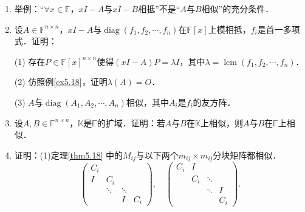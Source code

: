 \documentclass[a4paper,fontset=windows]{ctexbook}
\theoremstyle{definition}
\DeclareMathOperator{\diag}{diag}
\DeclareMathOperator{\lcm}{lcm}
\begin{document}
\begin{enumerate}
\item 举例：``$\forall x\in\mathbb{F}$，$xI-A$与$xI-B$相抵''不是``$A$与$B$相似''的充分条件．

\item 设$A\in\mathbb{F}^{n\times n}$，$xI-A$与$\diag(f_1,f_2,\cdots,f_n)$在$\mathbb{F}[x]$上模相抵，$f_i$是首一多项式．证明：

(1) 存在$P\in\mathbb{F}[x]^{n\times n}$使得$(xI-A)P=\lambda I$，其中$\lambda=\lcm(f_1,f_2,\cdots,f_n)$．

(2) 仿照例\ref{ex5.18}，证明$\lambda(A)=O$．

(3) $A$与$\diag(A_1,A_2,\cdots,A_n)$相似，其中$A_i$是$f_i$的友方阵．

\item 设$A,B\in\mathbb{F}^{n\times n}$，$\mathbb{K}$是$\mathbb{F}$的扩域．证明：若$A$与$B$在$\mathbb{K}$上相似，则$A$与$B$在$\mathbb{F}$上相似．

\item 证明：(1)定理\ref{thm5.18} 中的$M_{ij}$与以下两个$m_{ij}\times m_{ij}$分块矩阵都相似．
$$\begin{pmatrix}C_i&&& \\ I&C_i&& \\ &\ddots&\ddots& \\ &&I&C_i\end{pmatrix},\quad\begin{pmatrix}C_i&I&& \\ &C_i&\ddots& \\ &&\ddots&I \\ &&&C_i\end{pmatrix}.$$


\end{enumerate}
\end{document}
